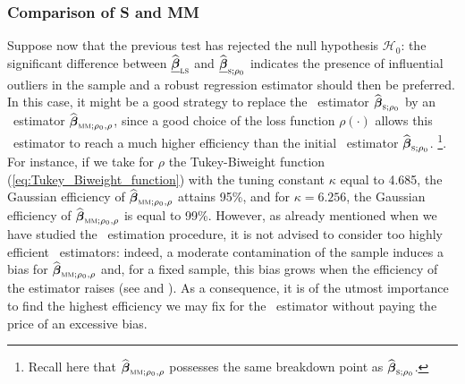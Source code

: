 \subsubsection{Comparison of S and MM}

Suppose now that the previous test has rejected the null hypothesis
$\mathcal{H}_0$: the significant difference between
$\sthat{\underline{\boldsymbol\beta}}_\stsc{LS}$ and
$\sthat{\underline{\boldsymbol\beta}}_{\stsc{S};\rho_0}$ indicates the presence
of influential outliers in the sample and a robust regression estimator should
then be preferred. In this case, it might be a good strategy to replace the
~estimator $\sthat{\boldsymbol\beta}_{\stsc{S};\rho_0}$ by an 
~estimator $\sthat{\boldsymbol\beta}_{\stsc{MM};\rho_0,\rho}$, since a good
choice of the loss function $\rho(\cdot)$ allows this ~estimator to
reach a much higher efficiency than the initial ~estimator
$\sthat{\boldsymbol\beta}_{\stsc{S};\rho_0}$. \footnote{Recall here that
$\sthat{\boldsymbol\beta}_{\stsc{MM};\rho_0,\rho}$ possesses the same breakdown
point as $\sthat{\boldsymbol\beta}_{\stsc{S};\rho_0}$.}. For instance, if we
take for $\rho$ the Tukey-Biweight function (\ref{eq:Tukey_Biweight_function})
with the tuning constant $\kappa$ equal to 4.685, the Gaussian efficiency of
$\sthat{\boldsymbol\beta}_{\stsc{MM};\rho_0,\rho}$ attains 95\%, and for
$\kappa=6.256$, the Gaussian efficiency of
$\sthat{\boldsymbol\beta}_{\stsc{MM};\rho_0,\rho}$ is equal to 99\%. However,
as already mentioned when we have studied the ~estimation procedure,
it is not advised to consider too highly efficient ~estimators:
indeed, a moderate contamination of the sample induces a bias for
$\sthat{\boldsymbol\beta}_{\stsc{MM};\rho_0,\rho}$ and, for a fixed sample,
this bias grows when the efficiency of the estimator raises (see
\citealp{maronna:etal:2006} and \citealp{Omelka:2010}). As a consequence, it is
of the utmost importance to find the highest efficiency we may fix for the
~estimator without paying the price of an excessive bias.

